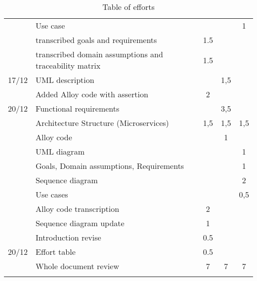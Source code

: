\begin{center}
\begin{longtable}{llccc}
        	&	Use case	&		&		&	1	\\
        	&	transcribed goals and requirements	&	1.5	&		&		\\
     	    &	transcribed domain assumptions and traceability matrix   	&	1.5	&		&		\\
        \hline
        17/12	&	UML description	&		&	1,5	&		\\
        	&	Added Alloy code with assertion	&	2	&		&		\\
        \hline
        20/12	&	Functional requirements	&		&	3,5	&		\\
        	&	Architecture Structure (Microservices)	&	1,5	&	1,5	&	1,5	\\
        	&	Alloy code	&		&	1	&		\\
        	&	UML diagram	&		&		&	1	\\
        	&	Goals, Domain assumptions, Requirements	&		&		&	1	\\
        	&	Sequence diagram	&		&		&	2	\\
        	&	Use cases	&		&		&	0,5	\\
        	&	Alloy code transcription	&	2	&		&		\\
        	&	Sequence diagram update	&	1	&		&		\\
        	&	Introduction revise	&	0.5	&		&		\\
        \hline
        20/12 & Effort table & 0.5 &    & \\
         & Whole document review & 7 & 7 & 7\\
        \hline
        
        \rowcolor{white}\caption{\label{tab:effort}Table of efforts}
        
    \end{longtable}
\end{center}